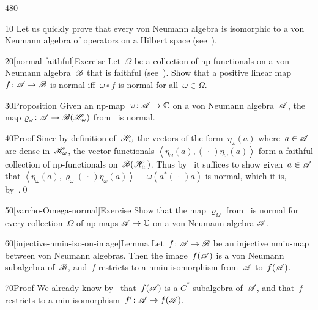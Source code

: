 \begin{parsec}{480}%
\begin{point}{10}%
Let us quickly prove that every von Neumann algebra
is isomorphic to a von Neumann algebra of operators on a 
Hilbert space (see~).
\end{point}
\begin{point}{20}[normal-faithful]{Exercise}%
Let~$\Omega$ be a collection of np-functionals
on a von Neumann algebra~$\mathscr{B}$
that is faithful (see~).
Show that a positive linear map $f\colon \mathscr{A}\to\mathscr{B}$
is normal iff~$\omega\circ f$
is normal for all~$\omega\in\Omega$.
\end{point}
\begin{point}{30}{Proposition}%
Given an np-map~$\omega\colon \mathscr{A} \to \mathbb{C}$
on a von Neumann algebra~$\mathscr{A}$,
the map $\varrho_\omega\colon \mathscr{A}\to\mathscr{B}(\mathscr{H}_\omega)$
from~ is normal.
\begin{point}{40}{Proof}%
Since by definition of~$\mathscr{H}_\omega$
the vectors of the form~$\eta_\omega(a)$
where~$a\in\mathscr{A}$
are dense in~$\mathscr{H}_\omega$,
the vector functionals
$\left<\eta_\omega(a),(\,\cdot\,)\eta_\omega(a)\right>$
form a faithful collection
of np-functionals on~$\mathscr{B}(\mathscr{H}_\omega)$.
Thus by~
it suffices to show given~$a\in\mathscr{A}$
that $\left<\eta_\omega(a),\varrho_\omega(\,\cdot\,)
\eta_\omega(a)\right>\equiv \omega(a^*(\,\cdot\,)a)$ is normal,
which it is, by~.\qed
\end{point}
\end{point}
\begin{point}{50}[varrho-Omega-normal]{Exercise}%
Show that the map $\varrho_\Omega$ 
from~
is normal for every collection~$\Omega$ of np-maps $\mathscr{A}\to\mathbb{C}$
on a von Neumann algebra $\mathscr{A}$.
\end{point}
\begin{point}{60}[injective-nmiu-iso-on-image]{Lemma}%
Let~$f\colon \mathscr{A}\to\mathscr{B}$ be an injective nmiu-map
between von Neumann algebras.
Then the image~$f(\mathscr{A})$ is a von Neumann subalgebra of~$\mathscr{B}$,
and~$f$ restricts to a nmiu-isomorphism from~$\mathscr{A}$
to~$f(\mathscr{A})$.
\begin{point}{70}{Proof}%
We already know by~
that~$f(\mathscr{A})$ is a $C^*$-subalgebra of~$\mathscr{A}$,
and that~$f$ restricts to a miu-isomorphism~$f'\colon \mathscr{A}\to f(\mathscr{A})$.

\end{point}
\end{point}
\end{parsec}
